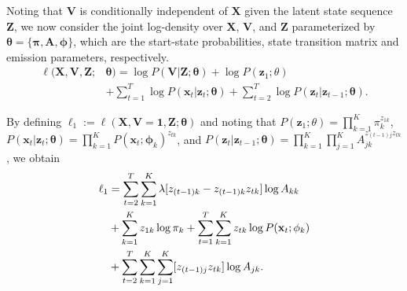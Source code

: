 \documentclass[letterpaper]{article}
\begin{document}
Noting that $\mathbf{V}$ is conditionally independent of $\mathbf{X}$ given the
latent state sequence $\mathbf{Z}$, we now consider the joint log-density over
$\mathbf{X}$, $\mathbf{V}$, and $\mathbf{Z}$ parameterized by
$\mathbf{\theta} = \{\mathbf{\pi},\mathbf{A}, \mathbf{\phi}\}$, which are the start-state
probabilities, state transition matrix and emission parameters, respectively. 
\begin{align*}
    \ell(\mathbf{X}, \mathbf{V}, \mathbf{Z} ; &\mathbf{\theta}) 
    = \log P(\mathbf{V}|\mathbf{Z}; \mathbf{\theta}) + \log P(\mathbf{z}_{1}; \theta) \\
    &+ \sum_{t=1}^{T}\log P(\mathbf{x}_t|\mathbf{z}_t; \mathbf{\theta})
     + \sum_{t=2}^{T}\log P(\mathbf{z}_t|\mathbf{z}_{t-1};\mathbf{\theta}).
\end{align*}

By defining $\ell_1 := \ell(\mathbf{X}, \mathbf{V}=\mathbf{1}, \mathbf{Z} ;
\mathbf{\theta})$ and noting that
$P(\mathbf{z}_{1}; \theta) = \prod_{k=1}^{K}\pi_{k}^{z_{1k}}$,
$P(\mathbf{x}_t|\mathbf{z}_t; \mathbf{\theta}) = \prod_{k=1}^{K}P(\mathbf{x}_t ;
\mathbf{\phi}_k)^{z_{tk}}$, and $P(\mathbf{z}_t|\mathbf{z}_{t-1};
\mathbf{\theta}) = \prod_{k=1}^{K}\prod_{j=1}^{K}A_{jk}^{z_{(t-1)j}z_{tk}}$,
we obtain
\begin{align*}
    \ell_1
    &= \sum^{T}_{t=2}\sum^{K}_{k=1}\lambda[z_{(t-1)k} - z_{(t-1)k}z_{tk}]\log A_{kk} \notag\\
    &+ \sum_{k=1}^{K}{z_{1k}}\log \pi_{k} + \sum_{t=1}^{T}\sum_{k=1}^{K} z_{tk}\log P(\mathbf{x}_t ; \mathbf{\phi}_k) \notag\\
    &+ \sum_{t=2}^{T}\sum_{k=1}^{K}\sum_{j=1}^{K}[z_{(t-1)j}z_{tk}]\log A_{jk}.
\end{align*}
\end{document}
